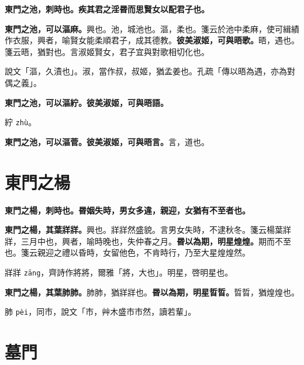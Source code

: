 
\textbf{東門之池，刺時也。疾其君之淫昬而思賢女以配君子也。}

\textbf{東門之池，可以漚麻。}{\footnotesize 興也。池，城池也。漚，柔也。箋云於池中柔麻，使可緝績作衣服，興者，喻賢女能柔順君子，成其德教。}\textbf{彼美淑姬，可與晤歌。}{\footnotesize 晤，遇也。箋云晤，猶對也。言淑姬賢女，君子宜與對歌相切化也。}

\begin{quoting}說文「漚，久漬也」。淑，當作叔，叔姬，猶孟姜也。孔疏「傳以晤為遇，亦為對偶之義」。\end{quoting}

\textbf{東門之池，可以漚紵。彼美淑姬，可與晤語。}

\begin{quoting}紵 \texttt{zhù}。\end{quoting}

\textbf{東門之池，可以漚菅。彼美淑姬，可與晤言。}{\footnotesize 言，道也。}

\section{東門之楊}


\textbf{東門之楊，刺時也。昬姻失時，男女多違，親迎，女猶有不至者也。}

\textbf{東門之楊，其葉牂牂。}{\footnotesize 興也。牂牂然盛貌。言男女失時，不逮秋冬。箋云楊葉牂牂，三月中也，興者，喻時晚也，失仲春之月。}\textbf{昬以為期，明星煌煌。}{\footnotesize 期而不至也。箋云親迎之禮以昏時，女留他色，不肯時行，乃至大星煌煌然。}

\begin{quoting}牂牂 \texttt{zāng}，齊詩作將將，爾雅「將，大也」。明星，啓明星也。\end{quoting}

\textbf{東門之楊，其葉肺肺。}{\footnotesize 肺肺，猶牂牂也。}\textbf{昬以為期，明星晢晢。}{\footnotesize 晢晢，猶煌煌也。}

\begin{quoting}肺 \texttt{pèi}，同巿，說文「巿，艸木盛巿巿然，讀若輩」。\end{quoting}

\section{墓門}


